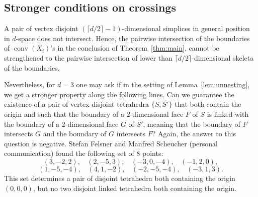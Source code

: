 \documentclass[english,a4paper,nolineno]{lipics-v2019}
\newcommand{\conv}{\mathop{\mathrm{conv}}}
\begin{document}
{\subsection{Stronger conditions on crossings}\label{sec:stronger}
%

A pair of vertex disjoint $(\lceil d/2 \rceil-1)$-dimensional simplices in general position in $d$-space does not intersect. 
Hence, the pairwise intersection of the boundaries of $\conv(X_i)$'s in the conclusion of   Theorem~\ref{thm:main}, cannot be strengthened to the pairwise intersection of lower than
$\lceil d/2 \rceil$-dimensional skeleta of the boundaries. 

Nevertheless, for $d=3$ one may ask if in the setting of Lemma~\ref{lem:unnesting}, we get a stronger property along the following lines. 
Can we guarantee the existence of a pair of vertex-disjoint tetrahedra $\{S,S'\}$ that both contain the origin and such that the boundary of a 2-dimensional face $F$  of $S$ is linked with the boundary of a 2-dimensional face $G$ of $S'$, meaning that the boundary of $F$ intersects $G$ and the boundary of $G$ intersects $F$? 
Again, the answer to this question is negative. Stefan Felsner and Manfred Scheucher (personal communication) found the following set of 8 points:
      $$(3, -2, 2),\ \ \ \
      (2, -5, 3),\ \ \ \
      (-3, 0, -4),\ \ \ \
      (-1, 2, 0),$$
      $$(1, -5, -4),\ \ \ \
      (4, 1, -2),\ \ \ \
      (-2, -5, -4),\ \ \ \
      (-3, 1, 3).$$
     This set determines a pair of disjoint tetrahedra both containing the origin $(0,0,0)$, but no two disjoint linked tetrahedra
     both containing the origin.

}
\end{document}

